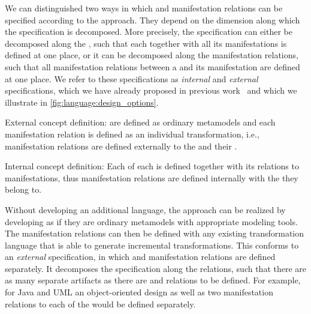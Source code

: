 We can distinguished two ways in which \conceptmetamodels and manifestation relations can be specified according to the \commonalities approach.
They depend on the dimension along which the specification is decomposed.
More precisely, the specification can either be decomposed along the \commonalities, such that each \commonality together with all its manifestations is defined at one place, or it can be decomposed along the manifestation relations, such that all manifestation relations between a \conceptmetamodel and its manifestation are defined at one place.
We refer to these specifications as \emph{internal} and \emph{external} specifications, which we have already proposed in previous work~ and which we illustrate in \autoref{fig:language:design_options}.
\begin{properdescription}
    \item[External concept definition:] \Conceptmetamodels are defined as ordinary metamodels and each manifestation relation is defined as an individual transformation, i.e., manifestation relations are defined externally to the \conceptmetamodels and their \commonalities.
    \item[Internal concept definition:] Each \commonality of each \conceptmetamodel is defined together with its relations to manifestations, thus manifestation relations are defined internally with the \commonalities they belong to.
\end{properdescription}

Without developing an additional language, the \commonalities approach can be realized by developing \conceptmetamodels as if they are ordinary metamodels with appropriate modeling tools.
The manifestation relations can then be defined with any existing transformation language that is able to generate incremental transformations. %
This conforms to an \emph{external} specification, in which \conceptmetamodels and manifestation relations are defined separately.
It decomposes the specification along the relations, such that there are as many separate artifacts as there are \conceptmetamodels and relations to be defined. %
For example, for Java and \gls{UML} an object-oriented design \conceptmetamodel as well as two manifestation relations to each of the \concretemetamodels would be defined separately.

